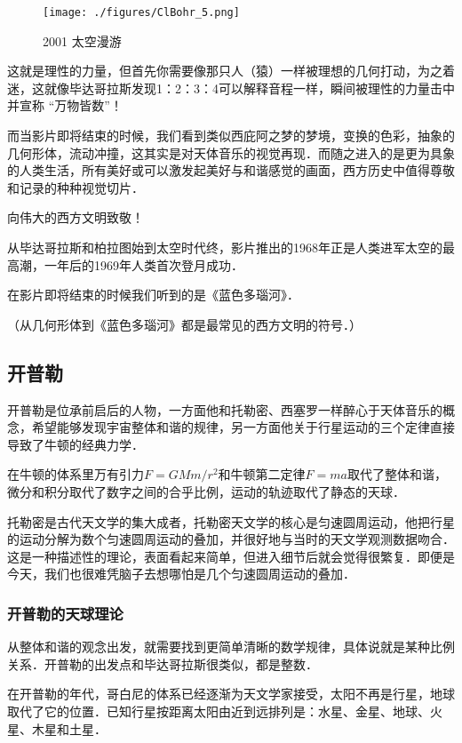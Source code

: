 \begin{figure}[ht]
\centering
\texttt{[image: ./figures/ClBohr\_5.png]}
\caption{2001 太空漫游} \label{ClBohr_fig5}
\end{figure}


这就是理性的力量，但首先你需要像那只人（猿）一样被理想的几何打动，为之着迷，这就像毕达哥拉斯发现1：2：3：4可以解释音程一样，瞬间被理性的力量击中并宣称 “万物皆数”！

而当影片即将结束的时候，我们看到类似西庇阿之梦的梦境，变换的色彩，抽象的几何形体，流动冲撞，这其实是对天体音乐的视觉再现．而随之进入的是更为具象的人类生活，所有美好或可以激发起美好与和谐感觉的画面，西方历史中值得尊敬和记录的种种视觉切片．

向伟大的西方文明致敬！

从毕达哥拉斯和柏拉图始到太空时代终，影片推出的1968年正是人类进军太空的最高潮，一年后的1969年人类首次登月成功．

在影片即将结束的时候我们听到的是《蓝色多瑙河》．

（从几何形体到《蓝色多瑙河》都是最常见的西方文明的符号．）


\subsection{开普勒}

开普勒是位承前启后的人物，一方面他和托勒密、西塞罗一样醉心于天体音乐的概念，希望能够发现宇宙整体和谐的规律，另一方面他关于行星运动的三个定律直接导致了牛顿的经典力学．

在牛顿的体系里万有引力$F = G M m /r^2$和牛顿第二定律$F = ma$取代了整体和谐，微分和积分取代了数字之间的合乎比例，运动的轨迹取代了静态的天球．

托勒密是古代天文学的集大成者，托勒密天文学的核心是匀速圆周运动，他把行星的运动分解为数个匀速圆周运动的叠加，并很好地与当时的天文学观测数据吻合．这是一种描述性的理论，表面看起来简单，但进入细节后就会觉得很繁复．即便是今天，我们也很难凭脑子去想哪怕是几个匀速圆周运动的叠加．

\subsubsection{开普勒的天球理论}

从整体和谐的观念出发，就需要找到更简单清晰的数学规律，具体说就是某种比例关系．开普勒的出发点和毕达哥拉斯很类似，都是整数．

在开普勒的年代，哥白尼的体系已经逐渐为天文学家接受，太阳不再是行星，地球取代了它的位置．已知行星按距离太阳由近到远排列是：水星、金星、地球、火星、木星和土星．

